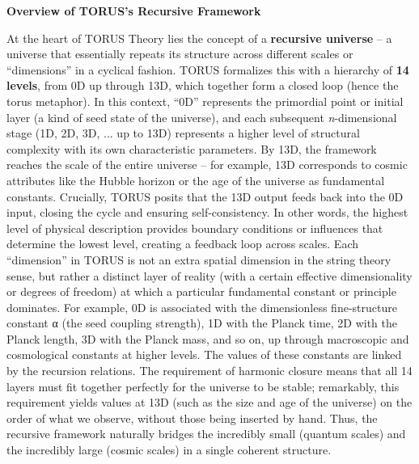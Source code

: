 \documentclass[
]{article}
\begin{document}
\textbf{Overview of TORUS's Recursive Framework}

At the heart of TORUS Theory lies the concept of a \textbf{recursive
universe} -- a universe that essentially repeats its structure across
different scales or ``dimensions'' in a cyclical fashion. TORUS
formalizes this with a hierarchy of \textbf{14 levels}, from 0D up
through 13D, which together form a closed loop (hence the torus
metaphor). In this context, ``0D'' represents the primordial point or
initial layer (a kind of seed state of the universe), and each
subsequent \emph{n}-dimensional stage (1D, 2D, 3D, ... up to 13D)
represents a higher level of structural complexity with its own
characteristic parameters. By 13D, the framework reaches the scale of
the entire universe -- for example, 13D corresponds to cosmic attributes
like the Hubble horizon or the age of the universe as fundamental
constants. Crucially, TORUS posits that the 13D output feeds back into
the 0D input, closing the cycle and ensuring self-consistency. In other
words, the highest level of physical description provides boundary
conditions or influences that determine the lowest level, creating a
feedback loop across scales. Each ``dimension'' in TORUS is not an extra
spatial dimension in the string theory sense, but rather a distinct
layer of reality (with a certain effective dimensionality or degrees of
freedom) at which a particular fundamental constant or principle
dominates. For example, 0D is associated with the dimensionless
fine-structure constant α (the seed coupling strength), 1D with the
Planck time, 2D with the Planck length, 3D with the Planck mass, and so
on, up through macroscopic and cosmological constants at higher levels.
The values of these constants are linked by the recursion relations. The
requirement of harmonic closure means that all 14 layers must fit
together perfectly for the universe to be stable; remarkably, this
requirement yields values at 13D (such as the size and age of the
universe) on the order of what we observe, without those being inserted
by hand. Thus, the recursive framework naturally bridges the incredibly
small (quantum scales) and the incredibly large (cosmic scales) in a
single coherent structure.
\end{document}
